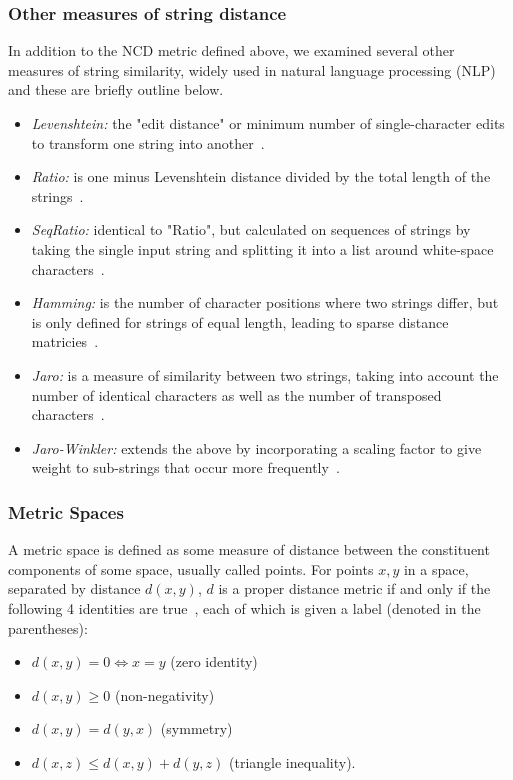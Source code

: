 \documentclass[conference]{IEEEtran}
\begin{document}
\subsubsection{Other measures of string distance}
\label{string_metrics}
In addition to the NCD metric defined above, we examined several other measures of string similarity, widely used in natural language processing (NLP) and these are briefly outline below.
\begin{itemize}
    \item \textit{Levenshtein:} the "edit distance" or minimum number of single-character edits to transform one string into another~\cite{navarro2001guided}.
    \item \textit{Ratio:} is one minus Levenshtein distance divided by the total length of the strings~\cite{levenshtein}.
    \item \textit{SeqRatio:} identical to "Ratio", but calculated on sequences of strings by taking the single input string and splitting it into a list around white-space characters~\cite{levenshtein}.
    \item \textit{Hamming:} is the number of character positions where two strings differ, but is only defined for strings of equal length, leading to sparse distance matricies~\cite{hamming_distance}.
    \item \textit{Jaro:} is a measure of similarity between two strings, taking into account the number of identical characters as well as the number of transposed characters~\cite{jaro}.
    \item \textit{Jaro-Winkler:} extends the above by incorporating a scaling factor to give weight to sub-strings that occur more frequently~\cite{jaro}. 
\end{itemize}



\subsubsection{Metric Spaces}

A metric space is defined as some measure of distance between the constituent components of some space, usually called points.  For points $x,y$ in a space, separated by distance $d(x,y)$, $d$ is a proper distance metric if and only if the following 4 identities are true~\cite{metrics}, each of which is given a label (denoted in the parentheses):

\label{metric_spaces}
\begin{itemize}
    \item $d(x, y) = 0 \iff x = y$ (zero identity)
    \item $d(x, y) \geq 0$ (non-negativity)
    \item $d(x, y) = d(y, x)$ (symmetry)
    \item $d(x, z) \leq d(x, y) + d(y, z)$ (triangle inequality).
\end{itemize}
\end{document}
